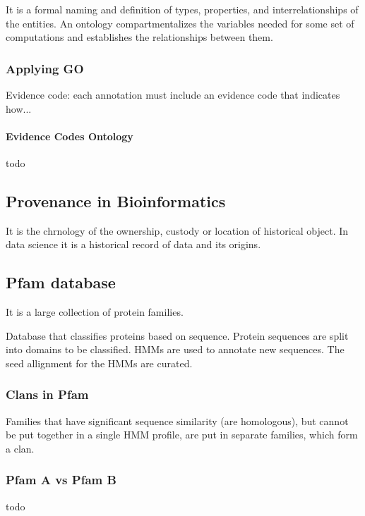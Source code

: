 It is a formal naming and definition of types, properties, and interrelationships
of the entities.
An ontology compartmentalizes the variables needed for some set of computations
and establishes the relationships between them.

\subsubsection{Applying GO}

Evidence code: each annotation must include an evidence code that indicates how...

\paragraph{Evidence Codes Ontology}

todo

\subsection{Provenance in Bioinformatics}

It is the chrnology of the ownership, custody or location of historical object.
In data science it is a historical record of data and its origins.

\subsection{Pfam database}

It is a large collection of protein families.

Database that classifies proteins based on sequence. Protein sequences are split 
into domains to be classified. HMMs are used to annotate new sequences. The seed
allignment for the HMMs are curated.

\subsubsection{Clans in Pfam}

Families that have significant sequence similarity (are homologous), but cannot 
be put together in a single HMM profile, are put in separate families, which form 
a clan.

\subsubsection{Pfam A vs Pfam B}

todo

